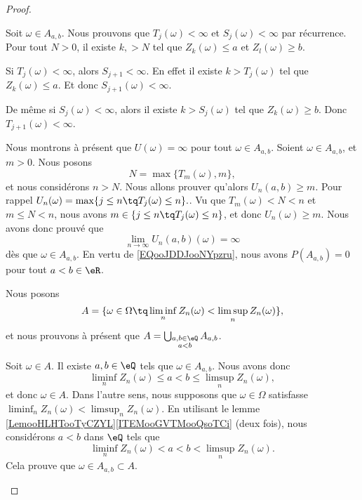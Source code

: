 \begin{proof}
\begin{subproof}

		Soit \( \omega\in A_{a,b}\). Nous prouvons que \( T_j(\omega)<\infty\) et \( S_j(\omega)<\infty\) par récurrence. Pour tout \( N>0\), il existe \( k,>N\) tel que \( Z_k(\omega)\leq a\) et \( Z_l(\omega)\geq b\).

		Si \( T_j(\omega)<\infty\), alors \( S_{j+1}<\infty\). En effet il existe \( k>T_j(\omega)\) tel que \( Z_k(\omega)\leq a\). Et donc \( S_{j+1}(\omega)<\infty\).

		De même si \( S_j(\omega)<\infty\), alors il existe \( k>S_j(\omega)\) tel que \( Z_k(\omega)\geq b\). Donc \( T_{j+1}(\omega)<\infty\).

		\spitem[\( U(a,b)=\infty\) sur \( A_{a,b}\)]


		Nous montrons à présent que \( U(\omega)=\infty\) pour tout \( \omega\in A_{a,b}\). Soient \( \omega\in A_{a,b}\), et \( m>0\). Nous posons
		\begin{equation}
			N=\max\{ T_m(\omega),m \},
		\end{equation}
		et nous considérons \( n>N\). Nous allons prouver qu'alors \( U_n(a,b)\geq m\). Pour rappel \( U_n(\omega)=\max\{ j\leq n\tq T_j(\omega)\leq n \}.\). Vu que \( T_m(\omega)<N<n\) et \( m\leq N<n\), nous avons \( m\in\{ j\leq n\tq T_j(\omega)\leq n \}\), et donc \( U_n(\omega)\geq m\). Nous avons donc prouvé que
		\begin{equation}
			\lim_{n\to \infty}U_n(a,b)(\omega)=\infty
		\end{equation}
		dès que \( \omega\in A_{a,b}\). En vertu de \eqref{EQooJDDJooNYpzru}, nous avons \( P(A_{a,b})=0\) pour tout \( a<b\in \eR\).


		Nous posons
		\begin{equation}
			A=\{ \omega\in \Omega\tq \liminf_nZ_n(\omega)<\limsup_nZ_n(\omega) \},
		\end{equation}
		et nous prouvons à présent que \( A=\bigcup_{\substack{ a,b\in \eQ \\ a<b }} A_{a,b} \).

		Soit \( \omega\in A\). Il existe \( a,b\in \eQ\) tels que \( \omega\in A_{a,b}\). Nous avons donc
		\begin{equation}
			\liminf_nZ_n(\omega)\leq a<b\leq \limsup_nZ_n(\omega),
		\end{equation}
		et donc \( \omega\in A\). Dans l'autre sens, nous supposons que \( \omega\in \Omega\) satisfasse \( \liminf_nZ_n(\omega)<\limsup_nZ_n(\omega)\). En utilisant le lemme \ref{LemooHLHTooTyCZYL}\ref{ITEMooGVTMooQsoTCi} (deux fois), nous considérons \( a<b\) dans \( \eQ\) tels que
		\begin{equation}
			\liminf_nZ_n(\omega)<a<b<\limsup_nZ_n(\omega).
		\end{equation}
		Cela prouve que \( \omega\in A_{a,b}\subset A\).


\end{subproof}
\end{proof}
